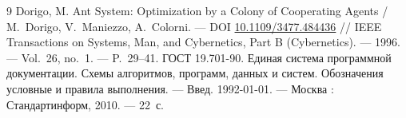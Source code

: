 \clearpage
\renewcommand{\refname}{СПИСОК ИСПОЛЬЗОВАННЫХ ИСТОЧНИКОВ}
\begin{thebibliography}{9}
Dorigo, M. Ant System: Optimization by a Colony of Cooperating Agents /
M.~Dorigo, V.~Maniezzo, A.~Colorni. ---
DOI \href{https://doi.org/10.1109/3477.484436}{10.1109/3477.484436} //
IEEE Transactions on Systems, Man, and Cybernetics, Part B (Cybernetics). ---
1996. --- Vol.~26, no.~1. --- P.~29--41.
ГОСТ 19.701-90. Единая система программной документации. Схемы алгоритмов,
программ, данных и систем. Обозначения условные и правила выполнения. ---
Введ. 1992-01-01. --- Москва : Стандартинформ, 2010. --- 22~с.
\end{thebibliography}



